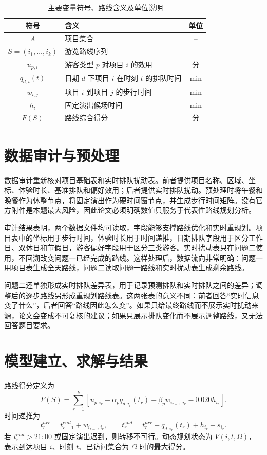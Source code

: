 \documentclass[UTF8,12pt,a4paper]{ctexart}
\begin{document}
\begin{table}[H]
\centering
\caption{主要变量符号、路线含义及单位说明}
\begin{tabularx}{\textwidth}{CLC}
\toprule
符号 & 含义 & 单位 \\
\midrule
\(A\) & 项目集合 & -- \\
\(S=(i_1,\ldots,i_k)\) & 游览路线序列 & -- \\
\(u_{p,i}\) & 游客类型 \(p\) 对项目 \(i\) 的效用 & 分 \\
\(q_{d,i}(t)\) & 日期 \(d\) 下项目 \(i\) 在时刻 \(t\) 的排队时间 & min \\
\(w_{i,j}\) & 项目 \(i\) 到项目 \(j\) 的步行时间 & min \\
\(h_i\) & 固定演出候场时间 & min \\
\(F(S)\) & 路线综合得分 & 分 \\
\bottomrule
\end{tabularx}
\end{table}

\section{数据审计与预处理}

数据审计重新核对项目基础表和实时排队扰动表。前者提供项目名称、区域、坐标、体验时长、基准排队和偏好效用；后者提供实时排队扰动。预处理时将午餐和晚餐作为休整节点，将固定演出作为硬时间窗节点，并生成步行时间矩阵。没有官方附件是本题最大风险，因此论文必须明确数值只服务于代表性路线规划分析。

审计结果表明，两个数据文件均可读取，字段能够支撑路线优化和实时重规划。项目表中的坐标用于步行时间，体验时长用于时间递推，日期排队字段用于区分工作日、双休日和节假日，游客偏好字段用于区分三类游客。实时扰动表只在问题二使用，不回溯改变问题一已经完成的路线。这样处理后，数据流向非常明确：问题一用项目表生成全天路线，问题二读取问题一路线和实时扰动表生成剩余路线。

问题二还单独形成实时排队差异表，用于记录预测排队和实时排队之间的差异；调整后的逐步路线另形成重规划路线表。这两张表的意义不同：前者回答“实时信息变了什么”，后者回答“路线因此怎么变”。如果只给最终路线而不展示实时扰动来源，论文会变成不可复核的建议；如果只展示排队变化而不展示调整路线，又无法回答题目要求。

\section{模型建立、求解与结果}

路线得分定义为
\begin{equation}
F(S)=\sum_{r=1}^{k}\left[u_{p,i_r}-\alpha_p q_{d,i_r}(t_r)-\beta_p w_{i_{r-1},i_r}-0.020h_{i_r}\right].
\end{equation}
时间递推为
\begin{equation}
t_r^{arr}=t_{r-1}^{end}+w_{i_{r-1},i_r},\qquad
t_r^{end}=t_r^{arr}+q_{d,i_r}(t_r)+h_{i_r}+s_{i_r}.
\end{equation}
若 \(t_r^{end}>21{:}00\) 或固定演出迟到，则转移不可行。动态规划状态为 \(V(i,t,\Omega)\)，表示到达项目 \(i\)、时刻 \(t\)、已访问集合为 \(\Omega\) 时的最大得分。
\end{document}

